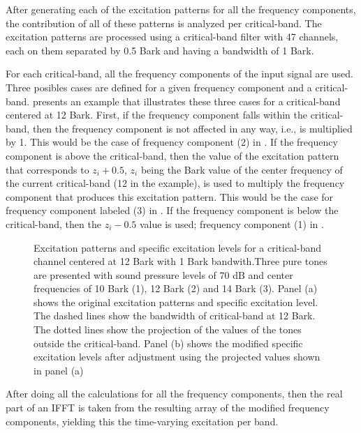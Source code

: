 \documentclass[../main.tex]{subfiles}
\begin{document}
\begin{modelchapter}
After generating each of the excitation patterns for all the frequency
components, the contribution of all of these patterns is analyzed per
critical-band. The excitation patterns are processed using a critical-band
filter with 47 channels, each on them separated by 0.5 Bark and having a
bandwidth of 1 Bark.

For each critical-band, all the frequency components of the input signal are
used. Three posibles cases are defined for a given frequency component and a
critical-band.  presents an example that illustrates these
three cases for a critical-band centered at 12 Bark. First, if the frequency
component falls within the critical-band, then the frequency component is not
affected in any way, i.e., is multiplied by 1. This would be the case of
frequency component (2) in . If the frequency component is
above the critical-band, then the value of the excitation pattern that
corresponds to $z_i + 0.5$, $z_i$ being the Bark value of the center frequency
of the current critical-band (12 in the example), is used to multiply the
frequency component that produces this excitation pattern. This would be the
case for frequency component labeled (3) in . If the
frequency component is below the critical-band, then the $z_i - 0.5$ value is
used; frequency component (1) in .

\begin{figure}[!ht]
  \centering
  
  
  \caption{Excitation patterns and specific excitation levels for a
    critical-band channel centered at 12 Bark with 1 Bark bandwith.Three pure
    tones are presented with sound pressure levels of 70 dB and center
    frequencies of 10 Bark (1), 12 Bark (2) and 14 Bark (3). Panel (a) shows the
    original excitation patterns and specific excitation level. The dashed lines
    show the bandwidth of critical-band at 12 Bark. The dotted lines show the
    projection of the values of the tones outside the critical-band. Panel (b)
    shows the modified specific excitation levels after adjustment using the
    projected values shown in panel (a)}
\label{fig:schrader}
\end{figure}

After doing all the calculations for all the frequency components, then the real
part of an \gls{IFFT} is taken from the resulting array of the modified
frequency components, yielding this the time-varying excitation per band.


\end{modelchapter}
\end{document}
